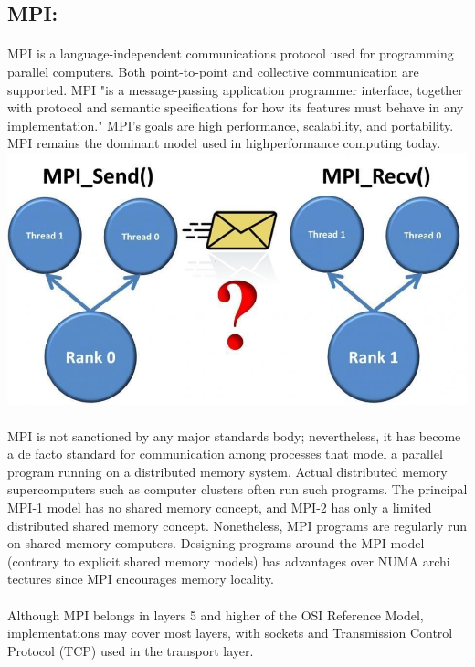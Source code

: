 \documentclass[a4paper,12pt]{article}
\begin{document}
\subsection{MPI: }
\paragraph{} MPI is a language-independent communications protocol used for programming parallel computers. Both point-to-point and collective communication are supported. MPI "is a message-passing application programmer interface, together with protocol and semantic specifications for how its features must behave in any implementation." MPI's goals are high performance, scalability, and portability. MPI remains the dominant model used in highperformance computing today. \\
\includegraphics[width = \textwidth]{clustertime_diag2}
\paragraph{} MPI is not sanctioned by any major standards body; nevertheless, it has become a de facto standard for communication among processes that model a parallel program running on a distributed memory system. Actual distributed memory supercomputers such as computer clusters often run such programs. The principal MPI-1 model has no shared memory concept, and MPI-2 has only a limited distributed shared memory concept. Nonetheless, MPI programs are regularly run on shared memory computers. Designing programs around the MPI model (contrary to explicit shared memory models) has advantages over NUMA archi tectures since MPI encourages memory locality. 
\paragraph{} Although MPI belongs in layers 5 and higher of the OSI Reference Model, implementations may cover most layers, with sockets and Transmission Control Protocol (TCP) used in the transport layer. 
\end{document}
